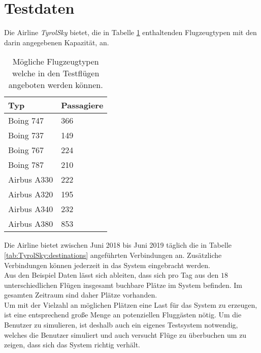 \section{Testdaten}
Die Airline \textit{TyrolSky} bietet, die in Tabelle \ref{tab:TyrolSky:airplanes} enthaltenden Flugzeugtypen mit den darin angegebenen Kapazität, an. 
\begin{table}[]
    \centering
    \begin{tabular}{ll}
    Typ & Passagiere \\ \hline
    Boing 747    &    366       \\
    Boing 737    &    149       \\
    Boing 767    &    224       \\
    Boing 787    &    210       \\
    Airbus A330    &    222       \\
    Airbus A320    &    195       \\
    Airbus A340    &    232       \\
    Airbus A380    &    853       \\    
\end{tabular}
\caption{Mögliche Flugzeugtypen welche in den Testflügen angeboten werden können.}
\label{tab:TyrolSky:airplanes}
\end{table}
Die Airline bietet zwischen Juni 2018 bis Juni 2019 täglich die in Tabelle \ref{tab:TyrolSky:destinations} angeführten Verbindungen an. Zusätzliche Verbindungen können jederzeit in das System eingebracht werden. \\
% 
% 
Aus den Beispiel Daten lässt sich ableiten, dass sich  pro Tag aus den $18$ unterschiedlichen Flügen insgesamt  buchbare Plätze im System befinden. Im gesamten Zeitraum sind daher  Plätze vorhanden. \\
Um mit der Vielzahl an möglichen Plätzen eine Last für das System zu erzeugen, ist eine entsprechend große Menge an potenziellen Fluggästen nötig. Um die Benutzer zu simulieren, ist deshalb auch ein eigenes Testsystem notwendig, welches die Benutzer simuliert und auch versucht Flüge zu überbuchen um zu zeigen, dass sich das System richtig verhält. \\
% 
% 

